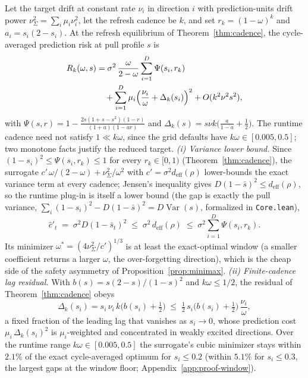 \documentclass[twoside,11pt]{article}
\begin{document}
\begin{theorem}
\label{thm:window}
Let the target drift at constant rate $\nu_i$ in direction $i$ with prediction-units drift power $\nu^2_\Sigma = \sum_i \mu_i \nu_i^2$, let the refresh cadence be $k$, and set $r_k = (1-\omega)^k$ and $a_i = s_i(2-s_i)$.
At the refresh equilibrium of Theorem~\ref{thm:cadence}, the cycle-averaged prediction risk at pull profile $s$ is
\[
\begin{aligned}
  R_k(\omega,s) &= \sigma^2\,\frac{\omega}{2-\omega}\sum_{i=1}^D \Psi(s_i,r_k) \\
  &\quad + \sum_{i=1}^D \mu_i\Bigl(\frac{\nu_i}{\omega} + \Delta_k(s_i)\Bigr)^2
  + O(k^2\nu^2 s^2),
\end{aligned}
\]
with $\Psi(s,r) = 1 - \frac{2s(1+s-s^2)(1-r)}{(1+a)(1-ar)}$ and $\Delta_k(s) = s\nu k\bigl(\frac{a}{1-a}+\frac12\bigr)$.
The runtime cadence need not satisfy $1 \ll k\omega$, since the grid defaults have $k\omega \in [0.005, 0.5]$; two monotone facts justify the reduced target.
\emph{(i) Variance lower bound.}
Since $(1-s_i)^2 \le \Psi(s_i,r_k) \le 1$ for every $r_k \in [0,1)$ (Theorem~\ref{thm:cadence}), the surrogate $c'\,\omega/(2-\omega)+\nu^2_\Sigma/\omega^2$ with $c' = \sigma^2 d_{\mathrm{eff}}(\rho)$ lower-bounds the exact variance term at every cadence; Jensen's inequality gives $D(1-\bar s)^2 \le d_{\mathrm{eff}}(\rho)$, so the runtime plug-in is itself a lower bound (the gap is exactly the pull variance, $\sum_i(1-s_i)^2 - D(1-\bar s)^2 = D\operatorname{Var}(s)$, formalized in \texttt{Core.lean}),
\[
  \hat c'_t \;=\; \sigma^2 D(1-\bar s_t)^2 \;\le\; \sigma^2\,d_{\mathrm{eff}}(\rho) \;\le\; \sigma^2 \sum_{i=1}^D \Psi(s_i,r_k).
\]
Its minimizer $\omega^* = (4\nu^2_\Sigma/c')^{1/3}$ is at least the exact-optimal window (a smaller coefficient returns a larger $\omega$, the over-forgetting direction), which is the cheap side of the safety asymmetry of Proposition~\ref{prop:minimax}.
\emph{(ii) Finite-cadence lag residual.}
With $b(s) = s(2-s)/(1-s)^2$ and $k\omega \le 1/2$, the residual of Theorem~\ref{thm:cadence} obeys
\[
  \Delta_k(s_i) = s_i\,\nu_i\,k\bigl(b(s_i)+\tfrac12\bigr) \;\le\; \tfrac12\,s_i\bigl(b(s_i)+\tfrac12\bigr)\,\frac{\nu_i}{\omega},
\]
a fixed fraction of the leading lag that vanishes as $s_i \to 0$, whose prediction cost $\mu_i\,\Delta_k(s_i)^2$ is $\mu_i$-weighted and concentrated in weakly excited directions.
Over the runtime range $k\omega \in [0.005, 0.5]$ the surrogate's cubic minimizer stays within $2.1\%$ of the exact cycle-averaged optimum for $s_i \le 0.2$ (within $5.1\%$ for $s_i \le 0.3$, the largest gaps at the window floor; Appendix~\ref{app:proof-window}).

\end{theorem}
\end{document}
